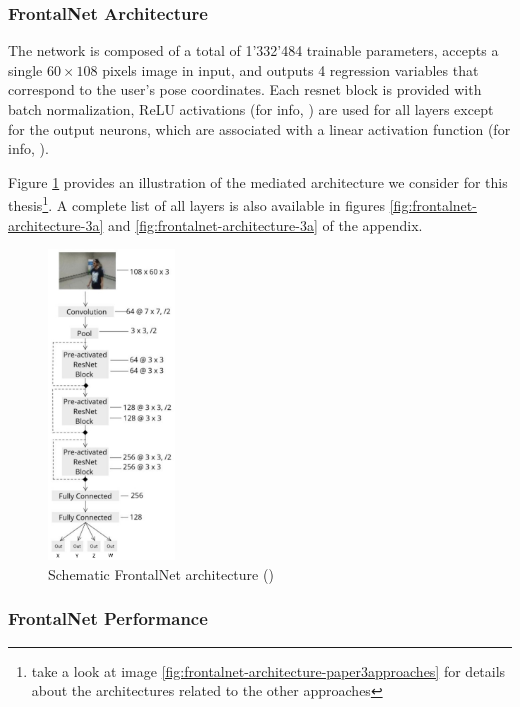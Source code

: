 \subsubsection{FrontalNet Architecture}
\label{subsec:frontalnet-architecture}

The network is composed of a total of 1'332'484 trainable parameters, accepts a single $60 \times 108$ pixels image in input, and outputs 4 regression variables that correspond to the user's pose coordinates. Each \gls{resnet} block is provided with batch normalization, ReLU activations (for info, \cite{act-relu}) are used for all layers except for the output neurons, which are associated with a linear activation function (for info, \cite{act-linear}). 

Figure \ref{fig:frontalnet-architecture-1} provides an illustration of the mediated architecture we consider for this thesis\footnote{take a look at image \ref{fig:frontalnet-architecture-paper3approaches} for details about the architectures related to the other approaches}. A complete list of all layers is also available in figures \ref{fig:frontalnet-architecture-3a} and \ref{fig:frontalnet-architecture-3a} of the appendix. 

\begin{figure}[!h]
	\centering
	\includegraphics[width=0.3\textwidth]{"contents/images/03-frontalnet-1A"}
	\caption[Schematic FrontalNet architecture]{Schematic FrontalNet architecture (\cite{mantegazza2019visionbased})}
	\label{fig:frontalnet-architecture-1}
\end{figure}


\subsubsection{FrontalNet Performance}
\label{subsec:frontalnet-performance}

